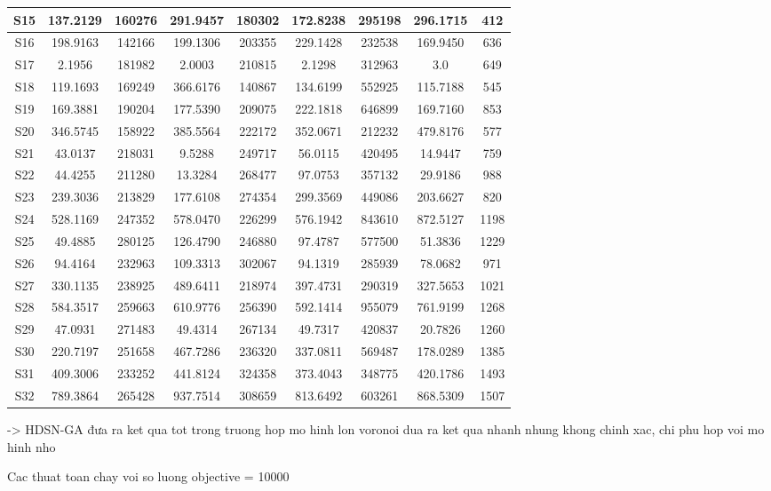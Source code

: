 \begin{table}
\begin{center}
{\begin{tabular}{|c|c|c|c|c|c|c|c|c|}
				S15	&  137.2129 & 160276 &  291.9457 & 180302 &  172.8238 & 295198 &  296.1715 &  412  \\ \hline
				S16	&  198.9163 & 142166 &  199.1306 & 203355 &  229.1428 & 232538 &  169.9450 &  636  \\ \hline
				S17	&  2.1956   & 181982 &  2.0003   & 210815 &  2.1298   & 312963 &  3.0      &  649  \\ \hline
				S18	&  119.1693 & 169249 &  366.6176 & 140867 &  134.6199 & 552925 &  115.7188 &  545  \\ \hline
				S19	&  169.3881 & 190204 &  177.5390 & 209075 &  222.1818 & 646899 &  169.7160 &  853  \\ \hline
				S20	&  346.5745 & 158922 &  385.5564 & 222172 &  352.0671 & 212232 &  479.8176 &  577  \\ \hline
				S21	&  43.0137  & 218031 &  9.5288   & 249717 &  56.0115  & 420495 &  14.9447  &  759  \\ \hline
				S22	&  44.4255  & 211280 &  13.3284  & 268477 &  97.0753  & 357132 &  29.9186  &  988  \\ \hline
				S23	&  239.3036 & 213829 &  177.6108 & 274354 &  299.3569 & 449086 &  203.6627 &  820  \\ \hline
				S24	&  528.1169 & 247352 &  578.0470 & 226299 &  576.1942 & 843610 &  872.5127 &  1198 \\ \hline
				S25	&  49.4885  & 280125 &  126.4790 & 246880 &  97.4787  & 577500 &  51.3836  &  1229 \\ \hline
				S26	&  94.4164  & 232963 &  109.3313 & 302067 &  94.1319  & 285939 &  78.0682  &  971  \\ \hline
				S27	&  330.1135 & 238925 &  489.6411 & 218974 &  397.4731 & 290319 &  327.5653 &  1021 \\ \hline
				S28	&  584.3517 & 259663 &  610.9776 & 256390 &  592.1414 & 955079 &  761.9199 &  1268 \\ \hline
				S29	&  47.0931  & 271483 &  49.4314  & 267134 &  49.7317  & 420837 &  20.7826  &  1260 \\ \hline
				S30	&  220.7197 & 251658 &  467.7286 & 236320 &  337.0811 & 569487 &  178.0289 &  1385 \\ \hline
				S31	&  409.3006 & 233252 &  441.8124 & 324358 &  373.4043 & 348775 &  420.1786 &  1493 \\ \hline
				S32	&  789.3864 & 265428 &  937.7514 & 308659 &  813.6492 & 603261 &  868.5309 &  1507 \\ \hline
		\end{tabular}}
	\end{center}
\end{table}

-> HDSN-GA đưa ra ket qua tot trong truong hop mo hinh lon
voronoi dua ra ket qua nhanh nhung khong chinh xac, chi phu hop voi mo hinh nho

Cac thuat toan chay voi so luong objective = 10000
